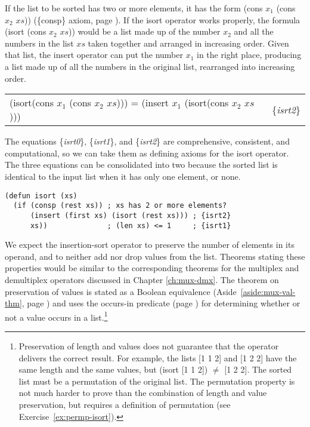 If the list to be sorted has two or more elements,
it has the form (cons $x_1$ (cons $x_2$ $xs$)) (\{consp\} axiom, page \pageref{consp-axiom}).
If the isort operator works properly,
the formula (isort (cons $x_2$ $xs$)) would be
a list made up of the number $x_2$ and all the numbers in the list $xs$
taken together and
arranged in increasing order.
Given that list, the insert operator can put the number $x_1$ in
the right place, producing a list made up of all the
numbers in the original list, rearranged into increasing order.

\begin{center}
\label{eq:isrt2}
\begin{tabular}{ll}
(isort(cons $x_1$ (cons $x_2$ $xs$))) = (insert $x_1$ (isort(cons $x_2$ $xs$))) & \{\emph{isrt2}\} \\
\end{tabular}
\end{center}

The equations \{\emph{isrt0}\}, \{\emph{isrt1}\}, and \{\emph{isrt2}\}
are comprehensive, consistent, and computational,
so we can take them as defining axioms for the isort operator.
The three equations can be consolidated into two because
the sorted list is identical to the input list when it has
only one element, or none.

\label{defun:isort}
\begin{Verbatim}
(defun isort (xs)
  (if (consp (rest xs)) ; xs has 2 or more elements?
      (insert (first xs) (isort (rest xs))) ; {isrt2}
      xs))              ; (len xs) <= 1     ; {isrt1}
\end{Verbatim}

We expect the insertion-sort operator to preserve
the number of elements in its operand, and to
neither add nor drop values from the list.
Theorems stating these properties would be
similar to the corresponding theorems for
the multiplex and demultiplex operators discussed
in Chapter \ref{ch:mux-dmx}.
The theorem on preservation of values is
stated as a
Boolean
equivalence
(Aside~\ref{aside:mux-val-thm}, page \pageref{aside:mux-val-thm})
and uses the occurs-in predicate
(page \pageref{def:occurs-in}) for determining
whether or not a value occurs in a list.\footnote{Preservation
of length and values does not guarantee
that the operator delivers the correct result.
For example, the lists [1 1 2] and [1 2 2] have the
same length and the same values,
but (isort [1 1 2]) $\neq$ [1 2 2].
The sorted list must be a permutation of the original list.
The permutation property is not much harder
to prove than the combination of length and value preservation,
but requires a definition of permutation
(see Exercise~\ref{ex:permp-isort}).}

